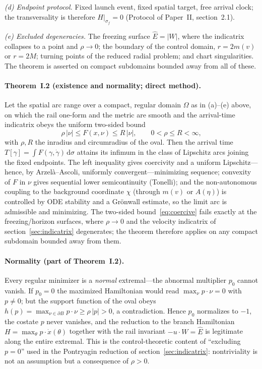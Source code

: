 \documentclass[12pt]{iopart}
\newcommand{\Ehat}{\hat E}
\newcommand{\dd}{\mathrm{d}}
\begin{document}
\emph{(d) Endpoint protocol.} Fixed launch event, fixed spatial target, free
arrival clock; the transversality is therefore $H|_{\sigma_f}=0$
(Protocol of Paper~II, section~2.1).

\emph{(e) Excluded degeneracies.} The freezing surface $\Ehat=|W|$, where the
indicatrix collapses to a point and $\rho\to0$; the boundary of the control
domain, $r=2m(v)$ or $r=2M$; turning points of the reduced radial problem; and
chart singularities. The theorem is asserted on compact subdomains bounded away
from all of these.

\paragraph{Theorem~I.2 (existence and normality; direct method).} Let the spatial arc range over a compact,
regular domain $\Omega$ as in (a)--(e) above, on which the rail one-form and the metric are smooth and
the arrival-time indicatrix obeys the uniform two-sided bound
\begin{equation}
  \rho\,|\nu| \le F(x,\nu) \le R\,|\nu|, \qquad 0<\rho\le R<\infty,
  \label{eq:coercive}
\end{equation}
with $\rho,R$ the inradius and circumradius of the oval. Then the arrival time
$T[\gamma]=\int F(\gamma,\dot\gamma)\,\dd\sigma$ attains its infimum in the class
of Lipschitz arcs joining the fixed endpoints. The left inequality gives
coercivity and a uniform Lipschitz---hence, by Arzel\`a--Ascoli, uniformly
convergent---minimizing sequence; convexity of $F$ in $\nu$ gives sequential lower
semicontinuity (Tonelli); and the non-autonomous coupling to the background
coordinate $\chi$ (through $m(v)$ or $A(\eta)$) is controlled by ODE stability and a
Gr\"onwall estimate, so the limit arc is admissible and minimizing. The two-sided
bound~\eqref{eq:coercive} fails exactly at the freezing/horizon surfaces, where
$\rho\to0$ and the velocity indicatrix of section~\ref{sec:indicatrix} degenerates; the
theorem therefore applies on any compact subdomain bounded away from them.

\paragraph{Normality (part of Theorem~I.2).} Every regular minimizer is a \emph{normal} extremal---the
abnormal multiplier $p_0$ cannot vanish. If $p_0=0$ the maximized Hamiltonian
would read $\max_\nu p\cdot\nu=0$ with $p\neq0$; but the support function of the oval
obeys $h(p)=\max_{\nu\in\partial B}p\cdot\nu\ge\rho\,|p|>0$, a contradiction. Hence
$p_0$ normalizes to $-1$, the costate $p$ never vanishes, and the reduction to the
branch Hamiltonian $H=\max_\theta p\cdot\dot x(\theta)$ together with the rail
invariant $-u\cdot W=\Ehat$ is legitimate along the entire extremal. This is the
control-theoretic content of ``excluding $p=0$'' used in the Pontryagin reduction
of section~\ref{sec:indicatrix}: nontriviality is not an assumption but a consequence
of $\rho>0$.
\end{document}

